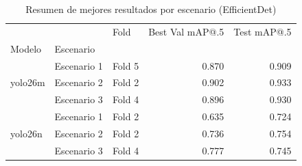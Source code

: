 \begin{table}
\caption{Resumen de mejores resultados por escenario (EfficientDet)}
\label{tab:best_results_effdet}
\begin{tabular}{lllrr}
\toprule
 &  & Fold & Best Val mAP@.5 & Test mAP@.5 \\
Modelo & Escenario &  &  &  \\
\midrule
\multirow[c]{3}{*}{yolo26m} & Escenario 1 & Fold 5 & 0.870 & 0.909 \\
 & Escenario 2 & Fold 2 & 0.902 & 0.933 \\
 & Escenario 3 & Fold 4 & 0.896 & 0.930 \\
\multirow[c]{3}{*}{yolo26n} & Escenario 1 & Fold 2 & 0.635 & 0.724 \\
 & Escenario 2 & Fold 2 & 0.736 & 0.754 \\
 & Escenario 3 & Fold 4 & 0.777 & 0.745 \\
\bottomrule
\end{tabular}
\end{table}
